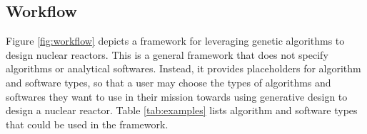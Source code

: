 \documentclass[letterpaper,11pt]{article}
\begin{document}
\subsection{Workflow}
Figure \ref{fig:workflow} depicts a framework for leveraging genetic algorithms
to design nuclear reactors. 
This is a general framework that does not specify algorithms or analytical 
softwares. 
Instead, it provides placeholders for algorithm and software types, so 
that a user may choose the types of algorithms and softwares they want to use in 
their mission towards using generative design to design a nuclear reactor. 
Table \ref{tab:examples} lists algorithm and software types that could be used 
in the framework. 
\end{document}
